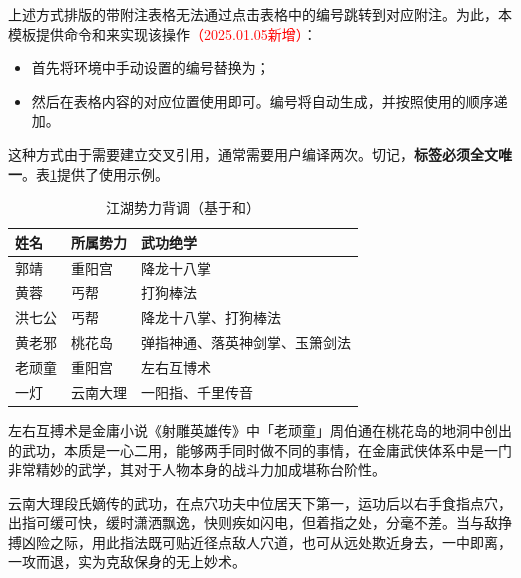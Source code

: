 \documentclass[doctor, vlined, ]{DissertUESTC}
\begin{document}
	上述方式排版的带附注表格无法通过点击表格中的编号跳转到对应附注。为此，本模板提供命令和来实现该操作\textcolor{red}{（2025.01.05新增）}：

	\begin{itemize}
		\item 首先将环境中手动设置的编号替换为；
		\item 然后在表格内容的对应位置使用即可。编号将自动生成，并按照使用的顺序递加。
	\end{itemize}

	这种方式由于需要建立交叉引用，通常需要用户编译两次。切记，\textbf{标签必须全文唯一}。表\ref{tab: 江湖势力背调（基于puttablenotelabel和tablenoteref）}提供了使用示例。

	\begin{table}[!ht]
		\caption{江湖势力背调（基于和）} \label{tab: 江湖势力背调（基于puttablenotelabel和tablenoteref）}
		\begin{threeparttable}
			\begin{tabular}{p{2cm} p{3cm} p{7cm}}
				\toprule
				\textbf{姓名} & \textbf{所属势力} & \textbf{武功绝学} \\
				\midrule
				郭靖 & 重阳宫 & 降龙十八掌 \\
				黄蓉 & 丐帮 & 打狗棒法 \\
				洪七公 & 丐帮 & 降龙十八掌、打狗棒法 \\
				黄老邪 & 桃花岛 & 弹指神通、落英神剑掌、玉箫剑法 \\
				老顽童 & 重阳宫 & 左右互博术\tablenoteref{tn: 左右互搏术} \\
				一灯 & 云南大理 & 一阳指\tablenoteref{tn: 一阳指}、千里传音 \\
				\bottomrule
			\end{tabular}
			\begin{tablenotes}
				\item[\puttablenotelabel{tn: 左右互搏术}] 左右互搏术是金庸小说《射雕英雄传》中「老顽童」周伯通在桃花岛的地洞中创出的武功，本质是一心二用，能够两手同时做不同的事情，在金庸武侠体系中是一门非常精妙的武学，其对于人物本身的战斗力加成堪称台阶性。
				\item[\puttablenotelabel{tn: 一阳指}] 云南大理段氏嫡传的武功，在点穴功夫中位居天下第一，运功后以右手食指点穴，出指可缓可快，缓时潇洒飘逸，快则疾如闪电，但着指之处，分毫不差。当与敌挣搏凶险之际，用此指法既可贴近径点敌人穴道，也可从远处欺近身去，一中即离，一攻而退，实为克敌保身的无上妙术。
			\end{tablenotes}
		\end{threeparttable}
	\end{table}
	
\end{document}
